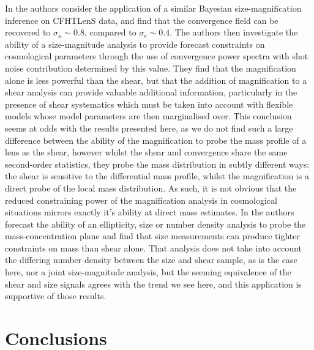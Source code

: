 \documentclass[useAMS,usenatbib,times,letter,amssymb]{mn2e}
\begin{document}
In \cite{Alsing:2014p2846} the authors consider the application of a similar Bayesian size-magnification inference on CFHTLenS data, and find that the convergence field can be recovered to $\sigma_\kappa \sim 0.8$, compared to $\sigma_e \sim 0.4$. The authors then investigate the ability of a size-magnitude analysis to provide forecast constraints on cosmological parameters through the use of convergence power spectra with shot noise contribution determined by this value. They find that the magnification alone is less powerful than the shear, but that the addition of magnification to a shear analysis can provide valuable additional information, particularly in the presence of shear systematics which must be taken into account with flexible models whose model parameters are then marginalised over. This conclusion seems at odds with the results presented here, as we do not find such a large difference between the ability of the magnification to probe the mass profile of a lens as the shear, however whilst the shear and convergence share the same second-order statistics, they probe the mass distribution in subtly different ways: the shear is sensitive to the differential mass profile, whilst the magnification is a direct probe of the local mass distribution. As such, it is not obvious that the reduced constraining power of the magnification analysis in cosmological situations mirrors exactly it's ability at direct mass estimates. In \cite{Rozo:2010p1496} the authors forecast the ability of an ellipticity, size or number density analysis to probe the mass-concentration plane and find that size measurements can produce tighter constraints on mass than shear alone. That analysis does not take into account the differing number density between the size and shear sample, as is the case here, nor a joint size-magnitude analysis, but the seeming equivalence of the shear and size signals agrees with the trend we see here, and this application is supportive of those results.

\section{Conclusions}\label{Sec:Conclusions}
\end{document}
